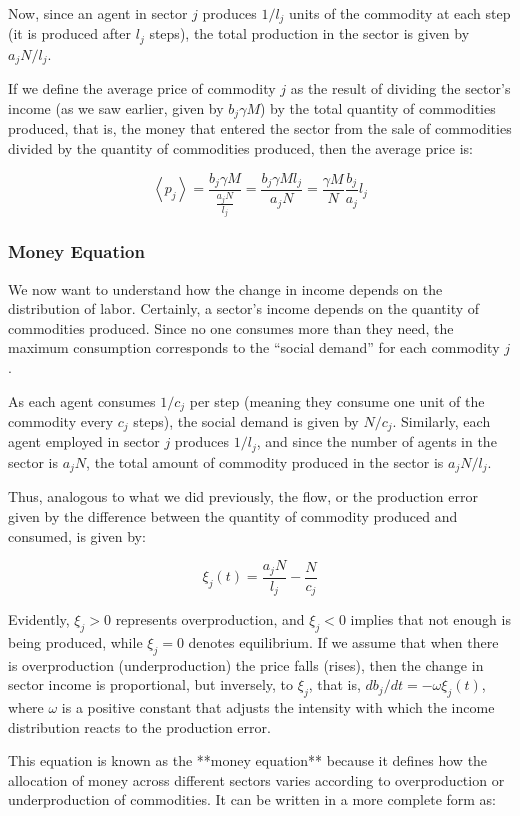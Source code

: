 Now, since an agent in sector $j$ produces $1/l_j$ units of the commodity at each step (it is produced after $l_j$ steps), the total production in the sector is given by $a_j N/l_j$.

If we define the average price of commodity $j$ as the result of dividing the sector’s income (as we saw earlier, given by $b_j \gamma M$) by the total quantity of commodities produced, that is, the money that entered the sector from the sale of commodities divided by the quantity of commodities produced, then the average price is:


$$\left\langle p_{j}\right\rangle =\frac{b_{j}\gamma M}{\frac{a_{j}N}{l_{j}}}=\frac{b_{j}\gamma Ml_{j}}{a_{j}N}=\frac{\gamma M}{N}\frac{b_{j}}{a_{j}}l_{j}$$

\subsubsection{Money Equation}

We now want to understand how the change in income depends on the distribution of labor. Certainly, a sector’s income depends on the quantity of commodities produced. Since no one consumes more than they need, the maximum consumption corresponds to the “social demand” for each commodity $j$.

As each agent consumes $1/c_j$ per step (meaning they consume one unit of the commodity every $c_j$ steps), the social demand is given by $N/c_j$. Similarly, each agent employed in sector $j$ produces $1/l_j$, and since the number of agents in the sector is $a_j N$, the total amount of commodity produced in the sector is $a_j N/l_j$.

Thus, analogous to what we did previously, the flow, or the production error given by the difference between the quantity of commodity produced and consumed, is given by:


$$\xi_{j}\left(t\right)=\frac{a_{j}N}{l_{j}}-\frac{N}{c_{j}}$$

Evidently, $\xi_{j}>0$ represents overproduction, and $\xi_{j}< 0$ implies that not enough is being produced, while $\xi_{j}=0$ denotes equilibrium. If we assume that when there is overproduction (underproduction) the price falls (rises), then the change in sector income is proportional, but inversely, to $\xi_{j}$, that is, $db_j/dt=-\omega \xi_j(t)$, where $\omega$ is a positive constant that adjusts the intensity with which the income distribution reacts to the production error.

This equation is known as the **money equation** because it defines how the allocation of money across different sectors varies according to overproduction or underproduction of commodities. It can be written in a more complete form as:


